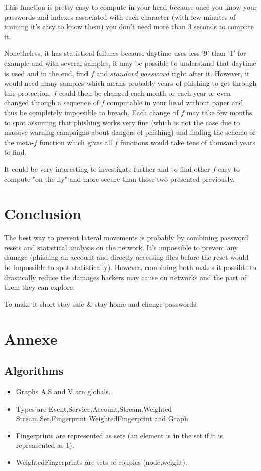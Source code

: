 \documentclass[11pt]{article}
\begin{document}
This function is pretty easy to compute in your head because once you know your passwords and indexes associated with each character (with few minutes of training it's easy to know them) you don't need more than 3 seconds to compute it.

Nonetheless, it has statistical failures because daytime uses less '9' than '1' for example and with several samples, it may be possible to understand that daytime is used and in the end, find $f$ and $standard\_password$ right after it. However, it would need many samples which means probably years of phishing to get through this protection. $f$ could then be changed each month or each year or even changed through a sequence of $f$ computable in your head without paper and thus be completely impossible to breach. Each change of $f$ may take few months to spot assuming that phishing works very fine (which is not the case due to massive warning campaigns about dangers of phishing) and finding the scheme of the meta-$f$ function which gives all $f$ functions would take tens of thousand years to find.

It could be very interesting to investigate further and to find other $f$ easy to compute "on the fly" and more secure than those two presented previously.

\section{Conclusion}
The best way to prevent lateral movements is probably by combining password resets and statistical analysis on the network. It's impossible to prevent any damage (phishing an account and directly accessing files before the reset would be impossible to spot statistically). However, combining both makes it possible to drastically reduce the damages hackers may cause on networks and the part of them they can explore.

To make it short stay safe \& stay home and change passwords.




\newpage
\section{Annexe}
\subsection{Algorithms}
\begin{itemize}
\item Graphs A,S and V are globals. 

\item Types are Event,Service,Account,Stream,Weighted Stream,Set,Fingerprint,WeightedFingerprint and Graph.

\item Fingerprints are represented as sets (an element is in the set if it is reprensented as 1). 

\item WeightedFingerprints are sets of couples (node,weight).

\end{itemize}
\end{document}
